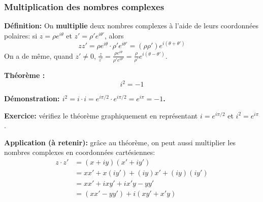 
\begin{frame}
\frametitle{\bf Multiplication des nombres complexes}
\medskip 

{\bf D\'efinition:} 
On {\bf multiplie} deux nombres complexes à l'aide de leurs coordonnées polaires: si $z=\rho e^{i\theta}$ et $z'=\rho'e^{i\theta'}$, alors
$$
\boxed{zz' = \rho e^{i\theta}\cdot \rho'e^{i\theta'}=(\rho\rho')e^{i(\theta+\theta')}}
$$
{\small On a de même, quand $z'\neq0$, $\frac{z}{z'} = \frac{\rho e^{i\theta}}{\rho'e^{i\theta'}}=\frac{\rho}{\rho'}e^{i(\theta-\theta')}$.}
\medskip


{\bf Théorème : }$$\boxed{i^2=-1}$$

\medskip
{\small {\bf Démonstration: $i^2=i\cdot i = e^{i\pi/2}\cdot e^{i\pi/2}=e^{i\pi}=-1$.}}
\medskip

{\small {\bf Exercice:} vérifiez le théorème graphiquement en représentant $i=e^{i\pi/2}$ et $i^2=e^{i\pi}$.}
\medskip

{\bf Application (à retenir):} grâce au théorème, on peut aussi multiplier les nombres complexes en coordonnées cartésiennes:
\begin{align*}
z\cdot z' &= (x+iy)(x'+iy') \\
&= xx' + x(iy') + (iy)x' + (iy)(iy') \\
&= xx' + ixy' + ix'y - yy' \\
&= (xx' - yy') + i(xy'+x'y)
\end{align*}


\end{frame}



